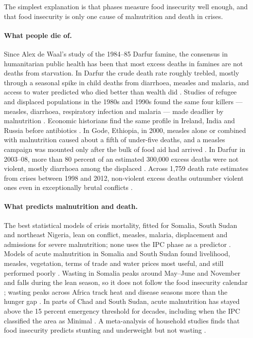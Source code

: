 \documentclass[11pt]{article}
\begin{document}
The simplest explanation is that phases measure food insecurity well enough, and that food insecurity is only one cause of malnutrition and death in crises.

\paragraph{What people die of.} Since Alex de Waal's study of the 1984--85 Darfur famine, the consensus in humanitarian public health has been that most excess deaths in famines are not deaths from starvation. In Darfur the crude death rate roughly trebled, mostly through a seasonal spike in child deaths from diarrhoea, measles and malaria, and access to water predicted who died better than wealth did \citep{dewaal1989famine,dewaal1989popstud}. Studies of refugee and displaced populations in the 1980s and 1990s found the same four killers --- measles, diarrhoea, respiratory infection and malaria --- made deadlier by malnutrition \citep{toole1990,toole1997}. Economic historians find the same profile in Ireland, India and Russia before antibiotics \citep{mokyr2002}. In Gode, Ethiopia, in 2000, measles alone or combined with malnutrition caused about a fifth of under-five deaths, and a measles campaign was mounted only after the bulk of food aid had arrived \citep{salama2001}. In Darfur in 2003--08, more than 80 percent of an estimated 300,000 excess deaths were not violent, mostly diarrhoea among the displaced \citep{degomme2010}. Across 1,759 death rate estimates from crises between 1998 and 2012, non-violent excess deaths outnumber violent ones even in exceptionally brutal conflicts \citep{heudtlass2016}.

\paragraph{What predicts malnutrition and death.} The best statistical models of crisis mortality, fitted for Somalia, South Sudan and northeast Nigeria, lean on conflict, measles, malaria, displacement and admissions for severe malnutrition; none uses the IPC phase as a predictor \citep{Checchi2022SAE,checchi2023nigeria}. Models of acute malnutrition in Somalia and South Sudan found livelihood, measles, vegetation, terms of trade and water prices most useful, and still performed poorly \citep{checchi2022malnut}. Wasting in Somalia peaks around May--June and November and falls during the lean season, so it does not follow the food insecurity calendar \citep{luc2024fex}; wasting peaks across Africa track heat and disease seasons more than the hunger gap \citep{venkat2023seasonality}. In parts of Chad and South Sudan, acute malnutrition has stayed above the 15 percent emergency threshold for decades, including when the IPC classified the area as Minimal \citep{youngmarshak2017}. A meta-analysis of household studies finds that food insecurity predicts stunting and underweight but not wasting \citep{moradi2019}.
\end{document}

